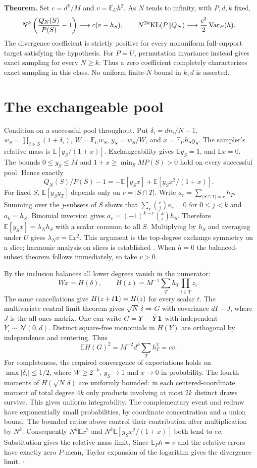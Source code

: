 \documentclass[11pt]{article}
\newcommand{\EE}{\mathbb E}
\begin{document}
\textbf{Theorem.} Set $c=d^k/M$ and $v=\EE_U h^2$. As $N$ tends to infinity, with $P,d,k$ fixed,
\[
 N^k\left(\frac{Q_N(S)}{P(S)}-1\right)\longrightarrow c(v-h_S),
 \qquad N^{2k}\mathrm{KL}(P\|Q_N)\longrightarrow
             \frac{c^2}{2}\operatorname{Var}_P(h).
\]
The divergence coefficient is strictly positive for every nonuniform full-support target satisfying the hypothesis. For $P=U$, permutation invariance instead gives exact sampling for every $N\ge k$. Thus a zero coefficient completely characterizes exact sampling in this class. No uniform finite-$N$ bound in $k,d$ is asserted.

\newpage
\section{The exchangeable pool}
Condition on a successful pool throughout. Put $\delta_i=dn_i/N-1$, $w_S=\prod_{i\in S}(1+\delta_i)$, $W=\EE_U w_S$, $y_S=w_S/W$, and $x=\EE_U h_S y_S$. The sampler's relative mass is $\EE[y_S/(1+x)]$. Exchangeability gives $\EE y_S=1$, and $\EE x=0$. The bounds $0\le y_S\le M$ and $1+x\ge \min_S MP(S)>0$ hold on every successful pool. Hence exactly
\[
 Q_N(S)/P(S)-1=-\EE[y_S x]+\EE[y_S x^2/(1+x)].
\]
For fixed $S$, $\EE[y_S y_T]$ depends only on $r=|S\cap T|$. Write $a_r=\sum_{|S\cap T|=r}h_T$. Summing over the $j$-subsets of $S$ shows that $\sum_r\binom rj a_r=0$ for $0\le j<k$ and $a_k=h_S$. Binomial inversion gives $a_r=(-1)^{k-r}\binom kr h_S$. Therefore $\EE[y_Sx]=\lambda_N h_S$ with a scalar common to all $S$. Multiplying by $h_S$ and averaging under $U$ gives $\lambda_N v=\EE x^2$. This argument is the top-degree exchange symmetry on a slice; harmonic analysis on slices is established \cite{filmus}. When $h=0$ the balanced-subset theorem follows immediately, so take $v>0$.

By the inclusion balances all lower degrees vanish in the numerator:
\[
  Wx=H(\delta),\qquad H(z)=M^{-1}\sum_T h_T\prod_{i\in T}z_i.
\]
The same cancellations give $H(z+t{\bf1})=H(z)$ for every scalar $t$. The multivariate central limit theorem gives $\sqrt N\,\delta\Rightarrow G$ with covariance $dI-J$, where $J$ is the all-ones matrix. One can write $G=Y-\bar Y{\bf1}$ with independent $Y_i\sim\mathcal N(0,d)$. Distinct square-free monomials in $H(Y)$ are orthogonal by independence and centering. Thus
\[
 \EE H(G)^2=M^{-2}d^k\sum_T h_T^2=cv.
\]
For completeness, the required convergence of expectations holds on $\max|\delta_i|\le1/2$, where $W\ge2^{-k}$, $y_S\to1$ and $x\to0$ in probability. The fourth moments of $H(\sqrt N\,\delta)$ are uniformly bounded: in each centered-coordinate moment of total degree $4k$ only products involving at most $2k$ distinct draws survive. This gives uniform integrability. The complementary event and redraw have exponentially small probabilities, by coordinate concentration and a union bound. The bounded ratios above control their contribution after multiplication by $N^k$. Consequently $N^k\EE x^2$ and $N^k\EE[y_Sx^2/(1+x)]$ both tend to $cv$. Substitution gives the relative-mass limit. Since $\EE_P h=v$ and the relative errors have exactly zero $P$-mean, Taylor expansion of the logarithm gives the divergence limit. \hfill$\square$
\end{document}
